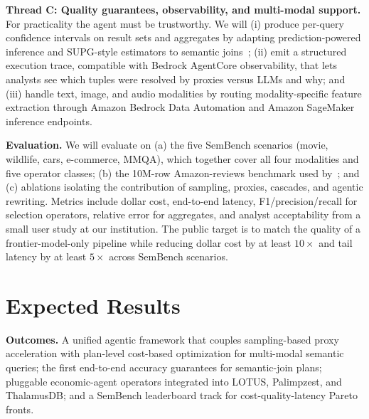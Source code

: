 \documentclass[11pt]{article}
\begin{document}
\noindent\textbf{Thread C: Quality guarantees, observability, and multi-modal support.}
For practicality the agent must be trustworthy. We will (i) produce per-query confidence intervals on result sets and aggregates by adapting prediction-powered inference and SUPG-style estimators to semantic joins~\cite{kang2020supg}; (ii) emit a structured execution trace, compatible with Bedrock AgentCore observability, that lets analysts see which tuples were resolved by proxies versus LLMs and why; and (iii) handle text, image, and audio modalities by routing modality-specific feature extraction through Amazon Bedrock Data Automation and Amazon SageMaker inference endpoints.

\noindent\textbf{Evaluation.}
We will evaluate on (a) the five SemBench scenarios (movie, wildlife, cars, e-commerce, MMQA), which together cover all four modalities and five operator classes; (b) the 10M-row Amazon-reviews benchmark used by~\cite{chung2026proxy}; and (c) ablations isolating the contribution of sampling, proxies, cascades, and agentic rewriting. Metrics include dollar cost, end-to-end latency, F1/precision/recall for selection operators, relative error for aggregates, and analyst acceptability from a small user study at our institution. The public target is to match the quality of a frontier-model-only pipeline while reducing dollar cost by at least $10\times$ and tail latency by at least $5\times$ across SemBench scenarios.

\section{Expected Results}

\noindent\textbf{Outcomes.} A unified agentic framework that couples sampling-based proxy acceleration with plan-level cost-based optimization for multi-modal semantic queries; the first end-to-end accuracy guarantees for semantic-join plans; pluggable economic-agent operators integrated into LOTUS, Palimpzest, and ThalamusDB; and a SemBench leaderboard track for cost-quality-latency Pareto fronts.
\end{document}
